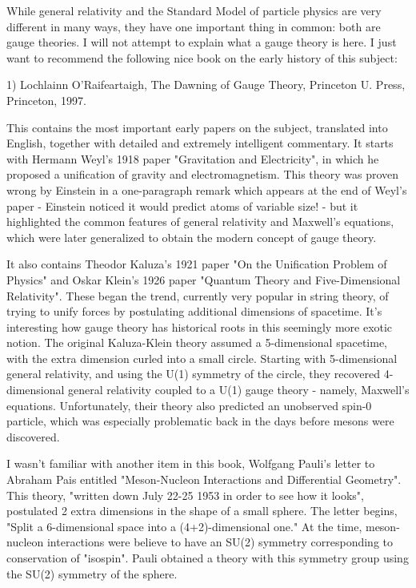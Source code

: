 

While general relativity and the Standard Model of particle physics are
very different in many ways, they have one important thing in common:
both are gauge theories.  I will not attempt to explain what a gauge
theory is here.  I just want to recommend the following nice book on the
early history of this subject:

1) Lochlainn O'Raifeartaigh, The Dawning of Gauge Theory, Princeton
U. Press, Princeton, 1997.

This contains the most important early papers on the subject, translated
into English, together with detailed and extremely intelligent
commentary.  It starts with Hermann Weyl's 1918 paper "Gravitation and
Electricity", in which he proposed a unification of gravity and
electromagnetism.  This theory was proven wrong by Einstein in a
one-paragraph remark which appears at the end of Weyl's paper -
Einstein noticed it would predict atoms of variable size! - but it
highlighted the common features of general relativity and Maxwell's
equations, which were later generalized to obtain the modern concept of
gauge theory.

It also contains Theodor Kaluza's 1921 paper "On the Unification Problem
of Physics" and Oskar Klein's 1926 paper "Quantum Theory and
Five-Dimensional Relativity".  These began the trend, currently very
popular in string theory, of trying to unify forces by postulating
additional dimensions of spacetime.  It's interesting how gauge theory
has historical roots in this seemingly more exotic notion.  The original
Kaluza-Klein theory assumed a 5-dimensional spacetime, with the extra
dimension curled into a small circle.  Starting with 5-dimensional
general relativity, and using the U(1) symmetry of the circle, they
recovered 4-dimensional general relativity coupled to a U(1) gauge
theory - namely, Maxwell's equations.  Unfortunately, their theory also
predicted an unobserved spin-0 particle, which was especially
problematic back in the days before mesons were discovered.

I wasn't familiar with another item in this book, Wolfgang Pauli's
letter to Abraham Pais entitled "Meson-Nucleon Interactions and
Differential Geometry".  This theory, "written down July 22-25 1953 in
order to see how it looks", postulated 2 extra dimensions in the shape
of a small sphere.  The letter begins, "Split a 6-dimensional space into
a (4+2)-dimensional one."  At the time, meson-nucleon interactions were
believe to have an SU(2) symmetry corresponding to conservation of
"isospin".  Pauli obtained a theory with this symmetry group using the
SU(2) symmetry of the sphere.

